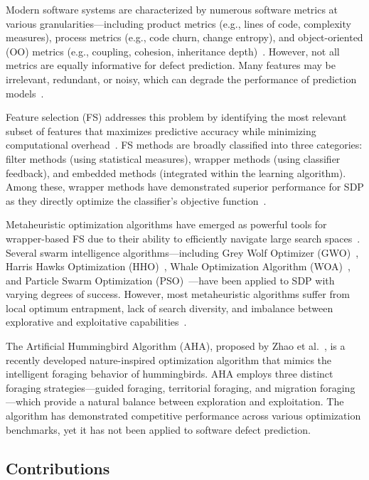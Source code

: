 \documentclass[conference,twocolumn]{IEEEtran}
\begin{document}
Modern software systems are characterized by numerous software metrics at various granularities---including product metrics (e.g., lines of code, complexity measures), process metrics (e.g., code churn, change entropy), and object-oriented (OO) metrics (e.g., coupling, cohesion, inheritance depth)~\cite{jureczko2010using}. However, not all metrics are equally informative for defect prediction. Many features may be irrelevant, redundant, or noisy, which can degrade the performance of prediction models~\cite{ghotra2015revisiting}.

Feature selection (FS) addresses this problem by identifying the most relevant subset of features that maximizes predictive accuracy while minimizing computational overhead~\cite{mafarja2018whale}. FS methods are broadly classified into three categories: filter methods (using statistical measures), wrapper methods (using classifier feedback), and embedded methods (integrated within the learning algorithm). Among these, wrapper methods have demonstrated superior performance for SDP as they directly optimize the classifier's objective function~\cite{kumar2024two}.

Metaheuristic optimization algorithms have emerged as powerful tools for wrapper-based FS due to their ability to efficiently navigate large search spaces~\cite{mirjalili2014grey}. Several swarm intelligence algorithms---including Grey Wolf Optimizer (GWO)~\cite{mirjalili2014grey}, Harris Hawks Optimization (HHO)~\cite{heidari2019harris}, Whale Optimization Algorithm (WOA)~\cite{mirjalili2016whale}, and Particle Swarm Optimization (PSO)~\cite{kennedy1995particle}---have been applied to SDP with varying degrees of success. However, most metaheuristic algorithms suffer from local optimum entrapment, lack of search diversity, and imbalance between explorative and exploitative capabilities~\cite{kumar2024two}.

The Artificial Hummingbird Algorithm (AHA), proposed by Zhao et al.~\cite{zhao2022artificial}, is a recently developed nature-inspired optimization algorithm that mimics the intelligent foraging behavior of hummingbirds. AHA employs three distinct foraging strategies---guided foraging, territorial foraging, and migration foraging---which provide a natural balance between exploration and exploitation. The algorithm has demonstrated competitive performance across various optimization benchmarks, yet it has not been applied to software defect prediction.

\subsection{Contributions}
\end{document}
